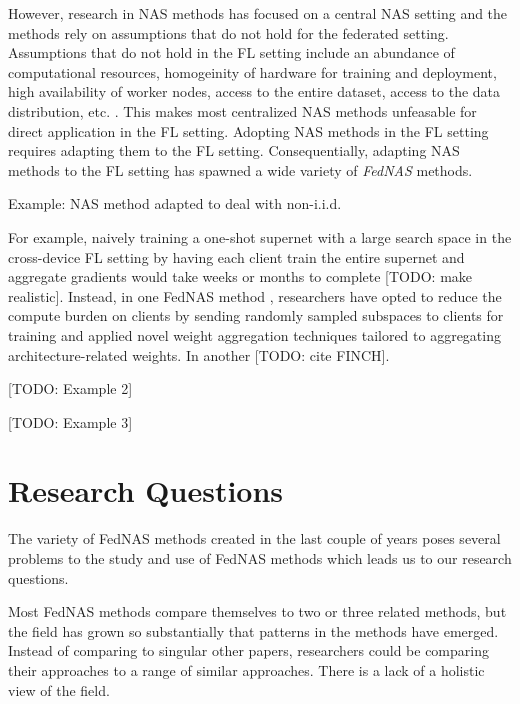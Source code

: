 However, research in NAS methods has focused on a central NAS setting and the methods rely on assumptions that do not hold for the federated setting. Assumptions that do not hold in the FL setting include an abundance of computational resources, homogeinity of hardware for training and deployment, high availability of worker nodes, access to the entire dataset, access to the data distribution, etc. \cite{fl_advances_and_open_problems_2021}. This makes most centralized NAS methods unfeasable for direct application in the FL setting. Adopting NAS methods in the FL setting requires adapting them to the FL setting. Consequentially, adapting NAS methods to the FL setting has spawned a wide variety of \textit{FedNAS} methods.

%
Example: NAS method adapted to deal with non-i.i.d.

For example, naively training a one-shot supernet with a large search space in the cross-device FL setting by having each client train the entire supernet and aggregate gradients would take weeks or months to complete [TODO: make realistic]. Instead, in one FedNAS method \cite{fedoras_2022}, researchers have opted to reduce the compute burden on clients by sending randomly sampled subspaces to clients for training and applied novel weight aggregation techniques tailored to aggregating architecture-related weights. In another [TODO: cite FINCH].


[TODO: Example 2]

[TODO: Example 3]

\section{Research Questions}

The variety of FedNAS methods created in the last couple of years poses several problems to the study and use of FedNAS methods which leads us to our research questions.

Most FedNAS methods compare themselves to two or three related methods, but the field has grown so substantially that patterns in the methods have emerged. Instead of comparing to singular other papers, researchers could be comparing their approaches to a range of similar approaches. There is a lack of a holistic view of the field.

